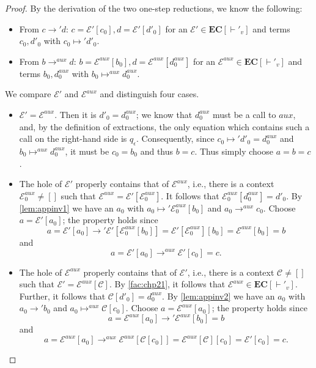 \comminv*
\begin{proof}
\label{prf:comminv}
By the derivation of the two one-step reductions, we know the following:
\begin{itemize}
\item From $c \longrightarrow' d$: $c = \mathcal{E}'[c_0], d = \mathcal{E}'[d'_0]$ for an $\mathcal{E}' \in \mathbf{EC}[\vdash'_v]$ and terms $c_0, d'_0$ with $c_0 \mapsto' d'_0$.

\item From $b \longrightarrow^{aux} d$: $b = \mathcal{E}^{aux}[b_0], d = \mathcal{E}^{aux}[d^{aux}_0]$ for an $\mathcal{E}^{aux} \in \mathbf{EC}[\vdash'_v]$ and terms $b_0, d^{aux}_0$ with $b_0 \mapsto^{aux} d^{aux}_0$.
\end{itemize}

We compare $\mathcal{E}'$ and $\mathcal{E}^{aux}$ and distinguish four cases.

\begin{itemize}
\item $\mathcal{E}' = \mathcal{E}^{aux}$. Then it is $d'_0 = d^{aux}_0$; we know that $d^{aux}_0$ must be a call to $aux$, and, by the definition of extractions, the only equation which contains such a call on the right-hand side is $q_\epsilon$. Consequently, since $c_0 \mapsto' d'_0 = d^{aux}_0$ and $b_0 \mapsto^{aux} d^{aux}_0$, it must be $c_0 = b_0$ and thus $b = c$. Thus simply choose $a = b = c$.

\item The hole of $\mathcal{E}'$ properly contains that of $\mathcal{E}^{aux}$, i.e., there is a context $\mathcal{E}^{aux}_0 \neq []$ such that $\mathcal{E}^{aux} = \mathcal{E}'[\mathcal{E}^{aux}_0]$. It follows that $\mathcal{E}^{aux}_0[d^{aux}_0] = d'_0$. By \autoref{lem:appinv1} we have an $a_0$ with $a_0 \mapsto' \mathcal{E}^{aux}_0[b_0]$ and $a_0 \longrightarrow^{aux} c_0$. Choose $a = \mathcal{E}'[a_0]$; the property holds since
\[
a = \mathcal{E}'[a_0] \longrightarrow' \mathcal{E}'[\mathcal{E}^{aux}_0[b_0]] = \mathcal{E}'[\mathcal{E}^{aux}_0][b_0] = \mathcal{E}^{aux}[b_0] = b
\]
and
\[
a = \mathcal{E}'[a_0] \longrightarrow^{aux} \mathcal{E}'[c_0] = c.
\]

\item The hole of $\mathcal{E}^{aux}$ properly contains that of $\mathcal{E}'$, i.e., there is a context $\mathcal{C} \neq []$ such that $\mathcal{E}' = \mathcal{E}^{aux}[\mathcal{C}]$. By \autoref{fac:chp21}, it follows that $\mathcal{E}^{aux} \in \mathbf{EC}[\vdash'_v]$. Further, it follows that $\mathcal{C}[d'_0] = d^{aux}_0$. By \autoref{lem:appinv2} we have an $a_0$ with $a_0 \longrightarrow' b_0$ and $a_0 \mapsto^{aux} \mathcal{C}[c_0]$. Choose $a = \mathcal{E}^{aux}[a_0]$; the property holds since
\[
a = \mathcal{E}^{aux}[a_0] \longrightarrow' \mathcal{E}^{aux}[b_0] = b
\]
and
\[
a = \mathcal{E}^{aux}[a_0] \longrightarrow^{aux} \mathcal{E}^{aux}[\mathcal{C}[c_0]] = \mathcal{E}^{aux}[\mathcal{C}][c_0] = \mathcal{E}'[c_0] = c.
\]


\end{itemize}
\end{proof}
